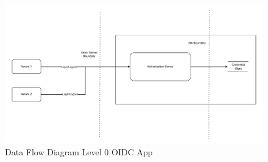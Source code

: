 \begin{figure}[h!]
\centering
\includegraphics[width=\textwidth]{pics/DFD_APP.pdf}
\caption{Data Flow Diagram Level 0 OIDC App}
\label{fig:dfd_app_fig}
\end{figure}


\label{subsec:stride}
